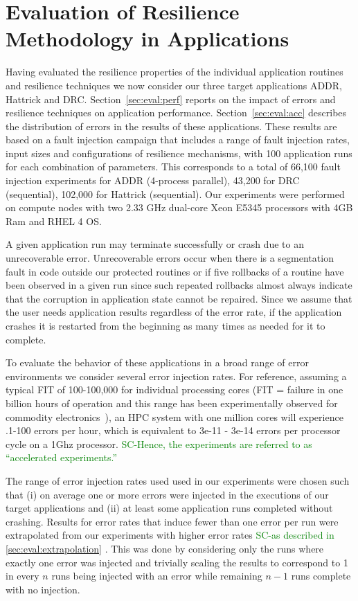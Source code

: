\documentclass{sig-alternate}
\newcommand{\sui}[1]{%
  \textcolor{green}{SC-#1}
}
\begin{document}
{\section{Evaluation of Resilience Methodology in Applications}
\label{sec:eval}

Having evaluated the resilience properties of the individual application routines and resilience techniques we now consider our three target applications ADDR, Hattrick and DRC.
Section~\ref{sec:eval:perf} reports on the impact of errors and resilience techniques on application performance. Section~\ref{sec:eval:acc} describes the distribution of errors in the results of these applications.
These results are based on a fault injection campaign that includes a range of fault injection rates, input sizes and configurations of resilience mechanisms, with 100 application runs for each combination of parameters.
This corresponds to a total of 66,100 fault injection experiments for ADDR (4-process parallel), 43,200 for DRC (sequential), 102,000 for Hattrick (sequential).
Our experiments were performed on compute nodes with two 2.33 GHz dual-core Xeon E5345 processors with 4GB Ram and RHEL 4 OS.

A given application run may terminate successfully or crash due to an unrecoverable error.
Unrecoverable errors occur when there is a segmentation fault in code outside our protected routines or if five rollbacks of a routine have been observed in a given run since such repeated rollbacks almost always indicate that the corruption in application state cannot be repaired.
Since we assume that the user needs application results regardless of the error rate, if the application crashes it is restarted from the beginning as many times as needed for it to complete.

To evaluate the behavior of these applications in a broad range of error environments we consider several error injection rates.
For reference, assuming a typical FIT of 100-100,000 for individual processing cores (FIT = failure in one billion hours of operation and this range has been experimentally observed for commodity electronics~\cite{mem_errors:2010, dram_error:2009}), an HPC system with one million cores will experience .1-100 errors per hour, which is equivalent to 3e-11 - 3e-14 errors per processor cycle on a 1Ghz processor. \sui{Hence, the experiments are referred to as ``accelerated experiments.''}
The range of error injection rates used used in our experiments were chosen such that (i) on average one or more errors were injected in the executions of our target applications and (ii) at least some application runs completed without crashing.
Results for error rates that induce fewer than one error per run were extrapolated from our experiments with higher error rates \sui{as described in \ref{sec:eval:extrapolation}}.
This was done by considering only the runs where exactly one error was injected and trivially scaling the results to correspond to 1 in every $n$ runs being injected with an error while remaining $n-1$ runs complete with no injection.\\

}
\end{document}
